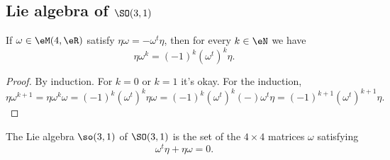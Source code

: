 \subsection{Lie algebra of \( \SO(3,1)\)}

\begin{lemma}       \label{LEMooEEDYooKuRxbW}
    If \( \omega\in \eM(4,\eR)\) satisfy \( \eta\omega=-\omega^t\eta\), then for every \( k\in \eN\) we have
    \begin{equation}
        \eta\omega^k=(-1)^k(\omega^t)^k\eta.
    \end{equation}
\end{lemma}

\begin{proof}
    By induction. For \( k=0\) or \( k=1\) it's okay. For the induction,
    \begin{equation}
        \eta\omega^{k+1}=\eta\omega^k\omega=(-1)^k(\omega^t)^k\eta\omega=(-1)^k(\omega^t)^k(-)\omega^t\eta=(-1)^{k+1}(\omega^t)^{k+1}\eta.
    \end{equation}
\end{proof}

\begin{proposition}        \label{PROPooGNHJooKILwuI}
    The Lie algebra \( \so(3,1)\) of \( \SO(3,1)\) is the set of the \( 4\times 4\) matrices \( \omega\) satisfying
    \begin{equation}
        \omega^t\eta+\eta\omega=0.
    \end{equation}
\end{proposition}

